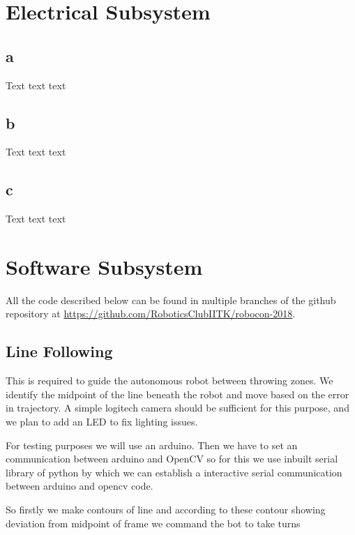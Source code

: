 \documentclass[11pt]{article}
\begin{document}
\pagebreak

\section{Electrical Subsystem}
\subsection{a}
Text text text
\subsection{b}
Text text text
\subsection{c}
Text text text

\pagebreak
\section{Software Subsystem}

All the code described below can be found in multiple branches of the github repository at \url{https://github.com/RoboticsClubIITK/robocon-2018}.

\subsection{Line Following}
This is required to guide the autonomous robot between throwing zones. We identify the midpoint of the line beneath the robot and move based on the error in trajectory. A simple logitech camera should be sufficient for this purpose, and we plan to add an LED to fix lighting issues.

For testing purposes we will use an arduino. Then we have to set an communication between arduino and OpenCV so for this we use inbuilt serial library of python by which we can establish a interactive serial communication between arduino and opencv code.

So firstly we make contours of line and according to these contour showing deviation from midpoint of frame we command the bot to take turns

    
\end{document}
